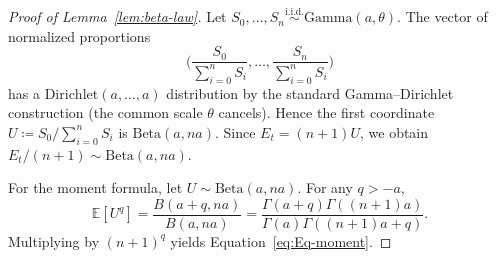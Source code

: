 \documentclass{uai2026} %
\newcommand{\1}{\mathbf{1}}
\newcommand{\expec}{\mathbb{E}}
\begin{document}
\begin{proof}[Proof of Lemma~\ref{lem:beta-law}]
  Let $S_{0},\dots,S_{n}\stackrel{\text{i.i.d.}}{\sim}\mathrm{Gamma}(a,\theta)$.
  The vector of normalized proportions
  \begin{equation*}
    \Big(\frac{S_{0}}{\sum_{i=0}^{n} S_{i}},\dots,\frac{S_{n}}{\sum_{i=0}^{n} S_{i}}\Big)
  \end{equation*}
  has a $\mathrm{Dirichlet}(a,\dots,a)$ distribution by the standard Gamma--Dirichlet construction (the common scale $\theta$ cancels).
  Hence the first coordinate $U \coloneqq S_{0}/\sum_{i=0}^{n} S_{i}$ is $\mathrm{Beta}(a,na)$.
  Since $E_{t}=(n+1)U$, we obtain $E_{t}/(n+1)\sim \mathrm{Beta}(a,na)$.

  For the moment formula, let $U\sim\mathrm{Beta}(a,na)$.
  For any $q>-a$,
  \begin{equation*}
    \expec[U^q]=\frac{B(a+q,na)}{B(a,na)}
    =\frac{\Gamma(a+q)\Gamma((n+1)a)}{\Gamma(a)\Gamma((n+1)a+q)}.
  \end{equation*}
  Multiplying by $(n+1)^q$ yields Equation~\eqref{eq:Eq-moment}.
\end{proof}\par\medskip
\end{document}
